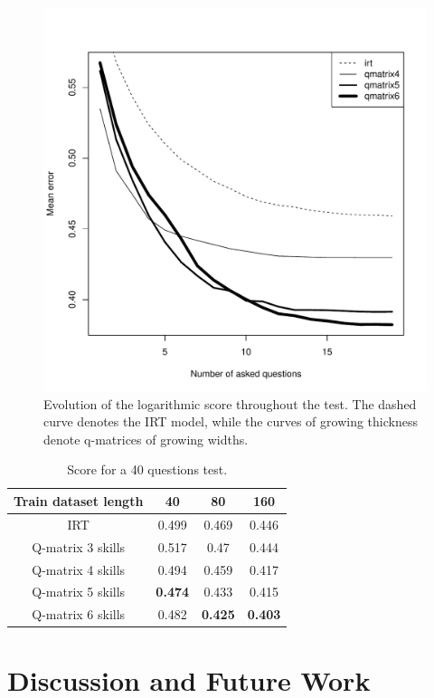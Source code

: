\documentclass{sig-alternate}
\begin{document}
\begin{figure}
\includegraphics[width=\linewidth]{20-80.pdf}
\caption{Evolution of the logarithmic score throughout the test. The dashed curve denotes the IRT model, while the curves of growing thickness denote q-matrices of growing widths.}
\label{fig:1}
\end{figure}

\begin{table}[H]
\begin{tabular}{cccc}
\bfseries Train dataset length & 40 & 80 & 160\\
\hline
IRT & 0.499 & 0.469 & 0.446\\
Q-matrix 3 skills & 0.517 & 0.47 & 0.444\\
Q-matrix 4 skills & 0.494 & 0.459 & 0.417\\
Q-matrix 5 skills & \textbf{0.474} & 0.433 & 0.415\\
Q-matrix 6 skills & 0.482 & \textbf{0.425} & \textbf{0.403}\\
\end{tabular}
\caption{Score for a 40 questions test.}
\label{tab:40q}
\end{table}

\section{Discussion and Future Work}
\end{document}
